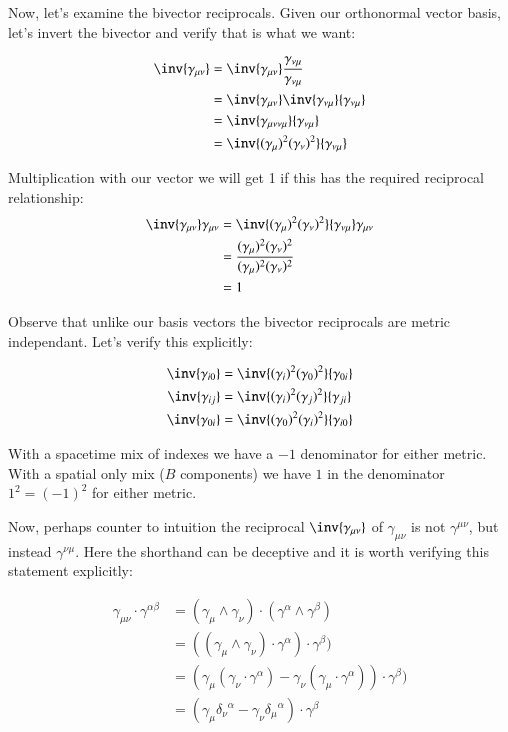 \documentclass{article}
\begin{document}
Now, let's examine the bivector reciprocals.  Given our orthonormal vector basis, let's invert the bivector and verify that is what we want:

\begin{align*}
\inv{\gamma_{\mu\nu}}
&= \inv{\gamma_{\mu\nu}} \frac{ \gamma_{\nu\mu} }{ \gamma_{\nu\mu} } \\
&= \inv{\gamma_{\mu\nu}} \inv{ \gamma_{\nu\mu} }{ \gamma_{\nu\mu} } \\
&= \inv{\gamma_{\mu\nu\nu\mu} }{ \gamma_{\nu\mu}} \\
&= \inv{ (\gamma_{\mu})^2 (\gamma_{\nu})^2 } { \gamma_{\nu\mu}} \\
\end{align*}

Multiplication with our vector we will get 1 if this has the required reciprocal relationship:
\begin{align*}
\inv{\gamma_{\mu\nu}} \gamma_{\mu\nu}
&= \inv{ (\gamma_{\mu})^2 (\gamma_{\nu})^2 } { \gamma_{\nu\mu}} \gamma_{\mu\nu} \\
&= \frac{ (\gamma_{\mu})^2 (\gamma_{\nu})^2 }{ (\gamma_{\mu})^2 (\gamma_{\nu})^2 } \\
&= 1
\end{align*}

Observe that unlike our basis vectors the bivector reciprocals are metric independant.  Let's verify this explicitly:

\begin{align*}
\inv{\gamma_{i0}} &= \inv{ (\gamma_{i})^2 (\gamma_{0})^2 } { \gamma_{0i}} \\
\inv{\gamma_{ij}} &= \inv{ (\gamma_{i})^2 (\gamma_{j})^2 } { \gamma_{ji}} \\
\inv{\gamma_{0i}} &= \inv{ (\gamma_{0})^2 (\gamma_{i})^2 } { \gamma_{i0}} \\
\end{align*}

With a spacetime mix of indexes we have a $-1$ denominator for either metric.  With a spatial only mix ($B$ components) we have $1$ in the denominator $1^2 = (-1)^2$ for either metric.

Now, perhaps counter to intuition the reciprocal $\inv{\gamma_{\mu\nu}}$ of $\gamma_{\mu\nu}$ is not $\gamma^{\mu\nu}$, but instead $\gamma^{\nu\mu}$.  Here the shorthand can be deceptive and it is worth verifying this statement explicitly:

\begin{align*}
\gamma_{\mu\nu} \cdot \gamma^{\alpha\beta}
&= (\gamma_{\mu} \wedge \gamma_{\nu}) \cdot (\gamma^{\alpha} \wedge \gamma^{\beta}) \\
&= ((\gamma_{\mu} \wedge \gamma_{\nu}) \cdot \gamma^{\alpha}) \cdot \gamma^{\beta}) \\
&= ( \gamma_{\mu} (\gamma_{\nu} \cdot \gamma^{\alpha}) - \gamma_{\nu} (\gamma_{\mu} \cdot \gamma^{\alpha}) ) \cdot \gamma^{\beta}) \\
&= ( \gamma_{\mu} {\delta_{\nu}}^{\alpha} - \gamma_{\nu} {\delta_{\mu}}^{\alpha} ) \cdot \gamma^{\beta} \\
\end{align*}
\end{document}

